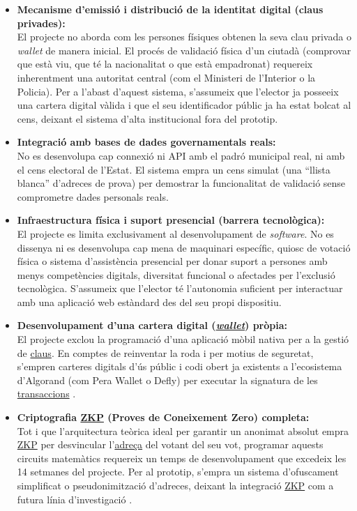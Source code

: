\begin{itemize}
    \item \textbf{Mecanisme d'emissió i distribució de la identitat digital (claus privades):} \\
    El projecte no aborda com les persones físiques obtenen la seva clau privada o \textit{wallet} de manera inicial. El procés de validació física d'un ciutadà (comprovar que està viu, que té la nacionalitat o que està empadronat) requereix inherentment una autoritat central (com el Ministeri de l'Interior o la Policia). Per a l'abast d'aquest sistema, s'assumeix que l'elector ja posseeix una cartera digital vàlida i que el seu identificador públic ja ha estat bolcat al cens, deixant el sistema d'alta institucional fora del prototip.
    
    \item \textbf{Integració amb bases de dades governamentals reals:} \\
    No es desenvolupa cap connexió ni API amb el padró municipal real, ni amb el cens electoral de l'Estat. El sistema empra un cens simulat (una ``llista blanca'' d'adreces de prova) per demostrar la funcionalitat de validació sense comprometre dades personals reals.

    \item \textbf{Infraestructura física i suport presencial (barrera tecnològica):} \\ El projecte es limita exclusivament al desenvolupament de \textit{software}. No es dissenya ni es desenvolupa cap mena de maquinari específic, quiosc de votació física o sistema d'assistència presencial per donar suport a persones amb menys competències digitals, diversitat funcional o afectades per l'exclusió tecnològica. S'assumeix que l'elector té l'autonomia suficient per interactuar amb una aplicació web estàndard des del seu propi dispositiu.
    
    \item \textbf{Desenvolupament d'una cartera digital (\hyperlink{def:wallet}{\textit{wallet}}) pròpia:} \\
    El projecte exclou la programació d'una aplicació mòbil nativa per a la gestió de \hyperlink{def:claus}{claus}. En comptes de reinventar la roda i per motius de seguretat, s'empren carteres digitals d'ús públic i codi obert ja existents a l'ecosistema d'Algorand (com Pera Wallet o Defly) per executar la signatura de les \hyperlink{def:transaccio}{transaccions} \cite{metamask}.
    
    \item \textbf{Criptografia \hyperlink{def:zkp}{ZKP} (Proves de Coneixement Zero) completa:} \\
    Tot i que l'arquitectura teòrica ideal per garantir un anonimat absolut empra \hyperlink{def:zkp}{ZKP} per desvincular l'\hyperlink{def:adreca}{adreça} del votant del seu vot, programar aquests circuits matemàtics requereix un temps de desenvolupament que excedeix les 14 setmanes del projecte. Per al prototip, s'empra un sistema d'ofuscament simplificat o pseudonimització d'adreces, deixant la integració \hyperlink{def:zkp}{ZKP} com a futura línia d'investigació \cite{groth2010} \cite{ethereum_zkp}.
    

\end{itemize}
